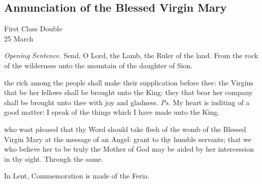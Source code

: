 



\subsection{Annunciation of the Blessed Virgin Mary}
\begin{inhead}
    {First Class Double\\
25 March}
\end{inhead}
\par\noindent
\textit{Opening Sentence.} Send, O Lord, the Lamb, the Ruler of the land. From the rock of the wilderness unto the mountain of the daughter of Sion.


\introit
{} the rich among the people shall make their supplication before thee: the Virgins that be her fellows shall be brought unto the King: they that bear her company shall be brought unto thee with joy and gladness. \textit{Ps.} My heart is inditing of a good matter: I speak of the things which I have made unto the King.

\collect
 who wast pleased that thy Word should take flesh of the womb of the Blessed Virgin Mary at the message of an Angel: grant to thy humble servants; that we who believe her to be truly the Mother of God may be aided by her intercession in thy sight. Through the same.
\begin{rubric}
    In Lent, Commemoration is made of the Feria.%
\end{rubric}

